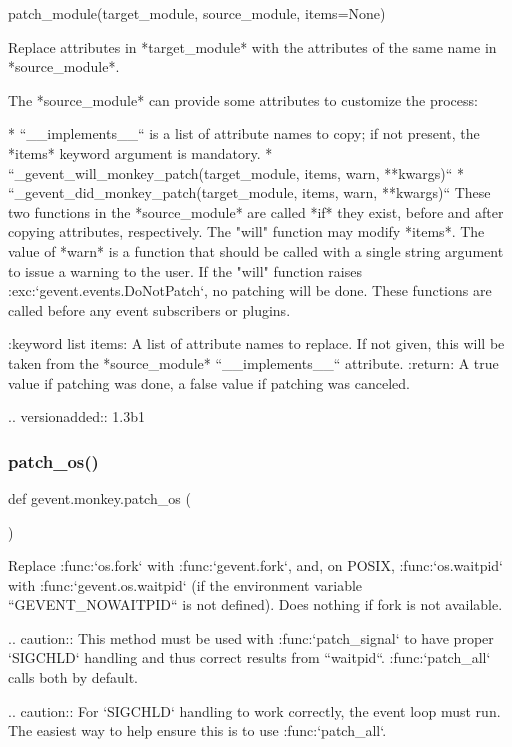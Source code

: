 \begin{DoxyVerb}patch_module(target_module, source_module, items=None)

Replace attributes in *target_module* with the attributes of the
same name in *source_module*.

The *source_module* can provide some attributes to customize the process:

* ``__implements__`` is a list of attribute names to copy; if not present,
  the *items* keyword argument is mandatory.
* ``_gevent_will_monkey_patch(target_module, items, warn, **kwargs)``
* ``_gevent_did_monkey_patch(target_module, items, warn, **kwargs)``
  These two functions in the *source_module* are called *if* they exist,
  before and after copying attributes, respectively. The "will" function
  may modify *items*. The value of *warn* is a function that should be called
  with a single string argument to issue a warning to the user. If the "will"
  function raises :exc:`gevent.events.DoNotPatch`, no patching will be done. These functions
  are called before any event subscribers or plugins.

:keyword list items: A list of attribute names to replace. If
   not given, this will be taken from the *source_module* ``__implements__``
   attribute.
:return: A true value if patching was done, a false value if patching was canceled.

.. versionadded:: 1.3b1
\end{DoxyVerb}
 \mbox{\label{namespacegevent_1_1monkey_ae0d897ace1d55978c5bdbcf59e963de3}} 
\subsubsection{\texorpdfstring{patch\+\_\+os()}{patch\_os()}}
{\footnotesize\ttfamily def gevent.\+monkey.\+patch\+\_\+os (\begin{DoxyParamCaption}{ }\end{DoxyParamCaption})}

\begin{DoxyVerb}Replace :func:`os.fork` with :func:`gevent.fork`, and, on POSIX,
:func:`os.waitpid` with :func:`gevent.os.waitpid` (if the
environment variable ``GEVENT_NOWAITPID`` is not defined). Does
nothing if fork is not available.

.. caution:: This method must be used with :func:`patch_signal` to have proper `SIGCHLD`
     handling and thus correct results from ``waitpid``.
     :func:`patch_all` calls both by default.

.. caution:: For `SIGCHLD` handling to work correctly, the event loop must run.
     The easiest way to help ensure this is to use :func:`patch_all`.
\end{DoxyVerb}
 \mbox{\label{namespacegevent_1_1monkey_a98bfba3bfb9f774f0a3480940d491f26}} 
